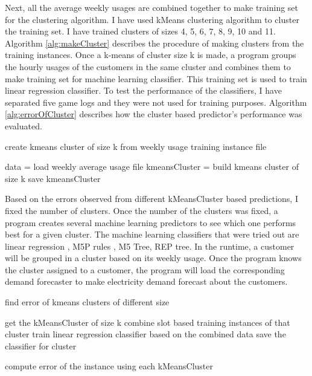 Next, all the average weekly usages are combined together to make training set for the clustering algorithm. I have used kMeans clustering algorithm to cluster the  training set. I have trained clusters of sizes 4, 5, 6, 7, 8, 9, 10 and 11. Algorithm \ref{alg:makeCluster} describes the procedure of making clusters from the training instances. Once a k-means of cluster size k is made, a program groups the hourly usages of the customers in the same cluster and combines them to make training set for  machine learning classifier. This training set is used to train linear regression classifier. To test the performance of the classifiers, I have separated five game logs and they were not used for training purposes. Algorithm \ref{alg:errorOfCluster} describes how the cluster based predictor's performance was evaluated. 


\begin{algorithm}
\caption{create kmeans cluster of size k from weekly usage training instance file}
\begin{algorithmic} [1]
\STATE data = load weekly average usage file
\STATE kmeansCluster = build kmeans cluster of size k
\STATE save kmeansCluster
\end{algorithmic}
\label{alg:makeCluster}
\end{algorithm}


Based on the errors observed from different kMeansCluster based predictions, I fixed the number of clusters. Once the number of the clusters was fixed, a program creates several machine learning predictors to see which one performs best for a given cluster. The machine learning classifiers that were tried out are linear regression \cite{witten2005data}, M5P rules \cite{witten2005data}, M5 Tree\cite{witten2005data}, REP tree\cite{witten2005data}. In the runtime, a customer will be grouped in a cluster based on its weekly usage. Once the program knows the cluster assigned to a customer, the program will load the corresponding demand forecaster to make electricity demand forecast about the customers.

\begin{algorithm}[!h]
\caption{find error of kmeans clusters of different size}
\begin{algorithmic} [1]

    \STATE get the kMeansCluster of size k
        \STATE combine slot based training instances of that cluster
        \STATE train linear regression classifier based on the combined data
        \STATE save the classifier for cluster
    \ENDFOR
\ENDFOR

    \STATE compute error of the instance using each kMeansCluster
\ENDFOR
\end{algorithmic}
\label{alg:errorOfCluster}
\end{algorithm}

